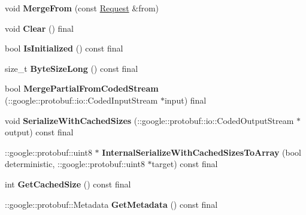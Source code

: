 \begin{DoxyCompactItemize}
\item 
\mbox{\label{classcoappbrpc_1_1Request_a745157bc69afe4509e157ca9835e2d9c}} 
void {\bfseries Merge\+From} (const \hyperlink{classcoappbrpc_1_1Request}{Request} \&from)
\item 
\mbox{\label{classcoappbrpc_1_1Request_a3699329574cf56b9b684dcb984176910}} 
void {\bfseries Clear} () final
\item 
\mbox{\label{classcoappbrpc_1_1Request_a3b3733fa1bb216ecaa3013b506485bf3}} 
bool {\bfseries Is\+Initialized} () const final
\item 
\mbox{\label{classcoappbrpc_1_1Request_af3933a049ac9a8bcae6efeccb6be6823}} 
size\+\_\+t {\bfseries Byte\+Size\+Long} () const final
\item 
\mbox{\label{classcoappbrpc_1_1Request_a590deeb6a5bf95ab9e0bdbff4d6ed92a}} 
bool {\bfseries Merge\+Partial\+From\+Coded\+Stream} (\+::google\+::protobuf\+::io\+::\+Coded\+Input\+Stream $\ast$input) final
\item 
\mbox{\label{classcoappbrpc_1_1Request_a707fec97351a1cf2e2af40c4628579a4}} 
void {\bfseries Serialize\+With\+Cached\+Sizes} (\+::google\+::protobuf\+::io\+::\+Coded\+Output\+Stream $\ast$output) const final
\item 
\mbox{\label{classcoappbrpc_1_1Request_abf99985c08c4b47e71275959b2a5a643}} 
\+::google\+::protobuf\+::uint8 $\ast$ {\bfseries Internal\+Serialize\+With\+Cached\+Sizes\+To\+Array} (bool deterministic, \+::google\+::protobuf\+::uint8 $\ast$target) const final
\item 
\mbox{\label{classcoappbrpc_1_1Request_a3e6421e0c870ce79d40ad896db78d0c7}} 
int {\bfseries Get\+Cached\+Size} () const final
\item 
\mbox{\label{classcoappbrpc_1_1Request_a09b5a02b3a1a5b62d9cc02e5861cebe4}} 
\+::google\+::protobuf\+::\+Metadata {\bfseries Get\+Metadata} () const final
\item 

\end{DoxyCompactItemize}
